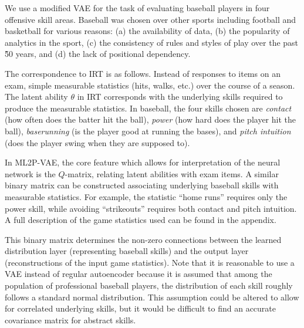 We use a modified VAE for the task of evaluating baseball players in four offensive skill areas. Baseball was chosen over other sports including football and basketball for various reasons: (a) the availability of data, (b) the popularity of analytics in the sport, (c) the consistency of rules and styles of play over the past \~50 years, and (d) the lack of positional dependency.

The correspondence to IRT is as follows. Instead of responses to items on an exam, simple measurable statistics (hits, walks, etc.) over the course of a season. The latent ability $\theta$ in IRT corresponds with the underlying skills required to produce the measurable statistics. In baseball, the four skills chosen are \textit{contact} (how often does the batter hit the ball), \textit{power} (how hard does the player hit the ball), \textit{baserunning} (is the player good at running the bases), and \textit{pitch intuition} (does the player swing when they are supposed to).

In ML2P-VAE, the core feature which allows for interpretation of the neural network is the $Q$-matrix, relating latent abilities with exam items. A similar binary matrix can be constructed associating underlying baseball skills with measurable statistics. For example, the statistic ``home runs'' requires only the power skill, while avoiding ``strikeouts'' requires both contact and pitch intuition. A full description of the game statistics used can be found in the appendix. 

This binary matrix determines the non-zero connections between the learned distribution layer (representing baseball skills) and the output layer (reconstructions of the input game statistics). Note that it is reasonable to use a VAE instead of regular autoencoder because it is assumed that among the population of professional baseball players, the distribution of each skill roughly follows a standard normal distribution. This assumption could be altered to allow for correlated underlying skills, but it would be difficult to find an accurate covariance matrix for abstract skills.

